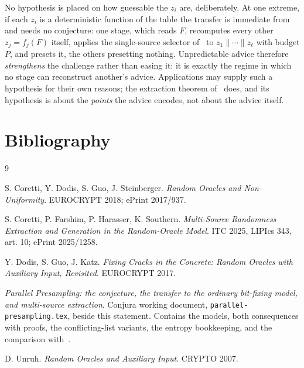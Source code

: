 \documentclass{conjura-conjecture}
\begin{document}
\begin{remark}\label{rem:det}
No hypothesis is placed on how guessable the $z_i$ are, deliberately. At
one extreme, if each $z_i$ is a deterministic function of the table the
transfer is immediate from~\cite{CDGS} and needs no conjecture: one stage,
which reads $F$, recomputes every other $z_j = f_j(F)$ itself, applies the
single-source selector of~\cite[Lem.~1]{CDGS} to $z_1\|\cdots\|z_\ell$
with budget $P$, and presets it, the others presetting nothing.
Unpredictable advice therefore \emph{strengthens} the challenge rather
than easing it: it is exactly the regime in which no stage can reconstruct
another's advice. Applications may supply such a hypothesis for their own
reasons; the extraction theorem of~\cite{PP} does, and its hypothesis is
about the \emph{points} the advice encodes, not about the advice itself.
\end{remark}

\section{Bibliography}

\begin{conjurabibliography}{9}

S. Coretti, Y. Dodis, S. Guo, J. Steinberger.
\emph{Random Oracles and Non-Uniformity}.
EUROCRYPT 2018; ePrint 2017/937.

S. Coretti, P. Farshim, P. Harasser, K. Southern.
\emph{Multi-Source Randomness Extraction and Generation in the
Random-Oracle Model}.
ITC 2025, LIPIcs 343, art. 10; ePrint 2025/1258.

Y. Dodis, S. Guo, J. Katz.
\emph{Fixing Cracks in the Concrete: Random Oracles with Auxiliary Input,
Revisited}.
EUROCRYPT 2017.

\emph{Parallel Presampling: the conjecture, the transfer to the ordinary
bit-fixing model, and multi-source extraction}. Conjura working document,
\texttt{parallel-presampling.tex}, beside this statement. Contains the
models, both consequences with proofs, the conflicting-list variants, the
entropy bookkeeping, and the comparison with~\cite{CFHS}.

D. Unruh.
\emph{Random Oracles and Auxiliary Input}.
CRYPTO 2007.

\end{conjurabibliography}
\end{document}
